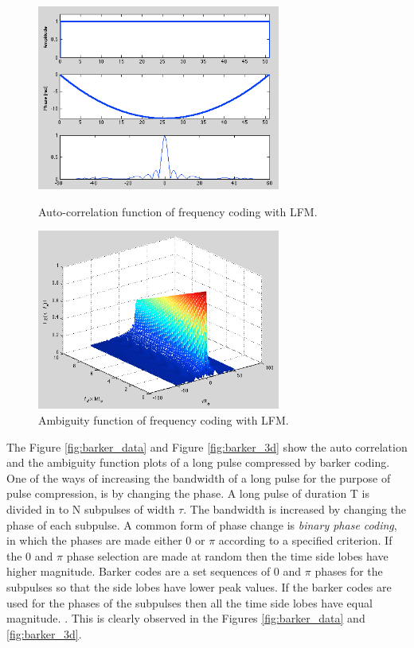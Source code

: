 \documentclass{article}
\begin{document}
\begin{figure}[tbh]
\begin{minipage}[t]{0.5\linewidth}
\centering
\includegraphics[width=8cm]{Figures/lfm_data.png}
\caption{Auto-correlation function of frequency coding with LFM.}
\label{fig:lfm_data}
\end{minipage}
\begin{minipage}[t]{0.5\linewidth}
\centering
\includegraphics[width=8cm]{Figures/lfm_3d.png}
\caption{Ambiguity function of frequency coding with LFM.}
\label{fig:lfm_3d}
\end{minipage}
\end{figure}


The Figure \ref{fig:barker_data} and Figure \ref{fig:barker_3d} show the auto correlation and the ambiguity function plots of a long pulse compressed by barker coding. One of the ways of increasing the bandwidth of a long pulse for the purpose of pulse compression, is by changing the phase. A long pulse of duration T is divided in to N subpulses of width $\tau$. The bandwidth is increased by changing the phase of each subpulse. A common form of phase change is \textit{binary phase coding}, in which the phases are made either 0 or $\pi$ according to a specified criterion. If the 0 and $\pi$ phase selection are made at random then the time side lobes have higher magnitude. Barker codes are a set sequences of 0 and $\pi$ phases for the subpulses so that the side lobes have lower peak values. If the barker codes are used for the phases of the subpulses then all the time side lobes have equal magnitude. \cite{Skolnik:2001irs}. This is clearly observed in the Figures \ref{fig:barker_data} and \ref{fig:barker_3d}.\\
\end{document}
